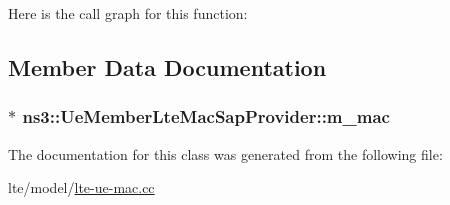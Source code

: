 Here is the call graph for this function\+:




\subsection{Member Data Documentation}
\subsubsection[{\texorpdfstring{m\+\_\+mac}{m_mac}}]{$\ast$ ns3\+::\+Ue\+Member\+Lte\+Mac\+Sap\+Provider\+::m\+\_\+mac\hspace{0.3cm}{\ttfamily [private]}}\hypertarget{classns3_1_1UeMemberLteMacSapProvider_a22c8e884743aad53d1f567008f9055c8}{}\label{classns3_1_1UeMemberLteMacSapProvider_a22c8e884743aad53d1f567008f9055c8}


The documentation for this class was generated from the following file\+:\begin{DoxyCompactItemize}
\item 
lte/model/\hyperlink{lte-ue-mac_8cc}{lte-\/ue-\/mac.\+cc}\end{DoxyCompactItemize}
